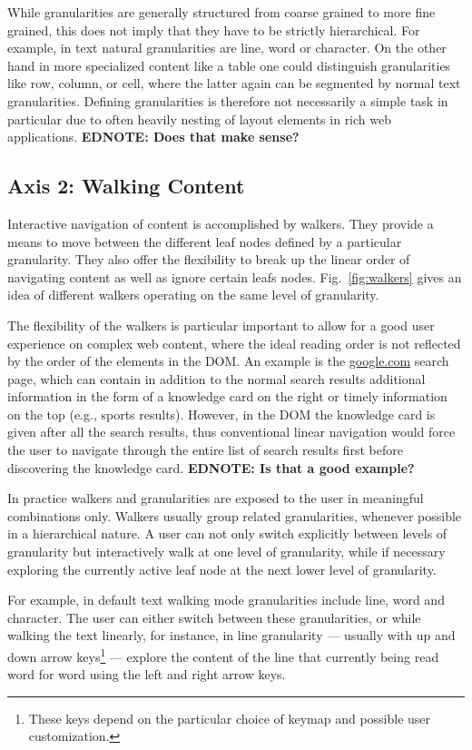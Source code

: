 \documentclass{sig-alternate}
\newcommand\ednote[1]{\typeout{There is still a note!!!}%
  {\bf EDNOTE: #1}}
\begin{document}
While granularities are generally structured from coarse grained to more fine
grained, this does not imply that they have to be strictly hierarchical. For
example, in text natural granularities are line, word or character. On the other
hand in more specialized content like a table one could distinguish
granularities like row, column, or cell, where the latter again can be segmented
by normal text granularities.  Defining granularities is therefore not
necessarily a simple task in particular due to often heavily nesting of layout
elements in rich web applications.\ednote{Does that make sense?}


\subsection{Axis 2: Walking Content}
\label{sec:ax2}

Interactive navigation of content is accomplished by walkers.  They provide a
means to move between the different leaf nodes defined by a particular
granularity. They also offer the flexibility to break up the linear order of
navigating content as well as ignore certain leafs nodes. Fig.~\ref{fig:walkers} gives
an idea of different walkers operating on the same level of granularity.

The flexibility of the walkers is particular important to allow for a good user
experience on complex web content, where the ideal reading order is not
reflected by the order of the elements in the DOM. An example is the
\url{google.com} search page, which can contain in addition to the normal search
results additional information in the form of a knowledge card on the right or
timely information on the top (e.g., sports results). However, in the DOM the
knowledge card is given after all the search results, thus conventional linear
navigation would force the user to navigate through the entire list of search
results first before discovering the knowledge card.\ednote{Is that a good
  example?}

In practice walkers and granularities are exposed to the user in meaningful
combinations only. Walkers usually group related granularities, whenever
possible in a hierarchical nature.  A user can not only switch explicitly
between levels of granularity but interactively walk at one level of
granularity, while if necessary exploring the currently active leaf node at the
next lower level of granularity.

For example, in default text walking mode granularities include line, word and
character. The user can either switch between these granularities, or while
walking the text linearly, for instance, in line granularity --- usually with up
and down arrow keys\footnote{These keys depend on the particular choice of
  keymap and possible user customization.}  --- explore the content of the line
that currently being read word for word using the left and right arrow keys.
\end{document}
